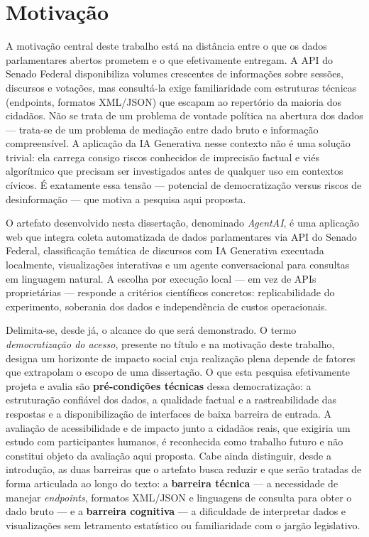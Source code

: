 \section{Motivação}
A motivação central deste trabalho está na distância entre o que os dados parlamentares abertos prometem e o que efetivamente entregam. A API do Senado Federal disponibiliza volumes crescentes de informações sobre sessões, discursos e votações, mas consultá-la exige familiaridade com estruturas técnicas (endpoints, formatos XML/JSON) que escapam ao repertório da maioria dos cidadãos. Não se trata de um problema de vontade política na abertura dos dados — trata-se de um problema de mediação entre dado bruto e informação compreensível. A aplicação da IA Generativa nesse contexto não é uma solução trivial: ela carrega consigo riscos conhecidos de imprecisão factual e viés algorítmico que precisam ser investigados antes de qualquer uso em contextos cívicos. É exatamente essa tensão — potencial de democratização versus riscos de desinformação — que motiva a pesquisa aqui proposta.

O artefato desenvolvido nesta dissertação, denominado \textit{AgentAI}, é uma aplicação web que integra coleta automatizada de dados parlamentares via API do Senado Federal, classificação temática de discursos com IA Generativa executada localmente, visualizações interativas e um agente conversacional para consultas em linguagem natural. A escolha por execução local — em vez de APIs proprietárias — responde a critérios científicos concretos: replicabilidade do experimento, soberania dos dados e independência de custos operacionais.

Delimita-se, desde já, o alcance do que será demonstrado. O termo \textit{democratização do acesso}, presente no título e na motivação deste trabalho, designa um horizonte de impacto social cuja realização plena depende de fatores que extrapolam o escopo de uma dissertação. O que esta pesquisa efetivamente projeta e avalia são \textbf{pré-condições técnicas} dessa democratização: a estruturação confiável dos dados, a qualidade factual e a rastreabilidade das respostas e a disponibilização de interfaces de baixa barreira de entrada. A avaliação de acessibilidade e de impacto junto a cidadãos reais, que exigiria um estudo com participantes humanos, é reconhecida como trabalho futuro e não constitui objeto da avaliação aqui proposta. Cabe ainda distinguir, desde a introdução, as duas barreiras que o artefato busca reduzir e que serão tratadas de forma articulada ao longo do texto: a \textbf{barreira técnica} --- a necessidade de manejar \textit{endpoints}, formatos XML/JSON e linguagens de consulta para obter o dado bruto --- e a \textbf{barreira cognitiva} --- a dificuldade de interpretar dados e visualizações sem letramento estatístico ou familiaridade com o jargão legislativo.

